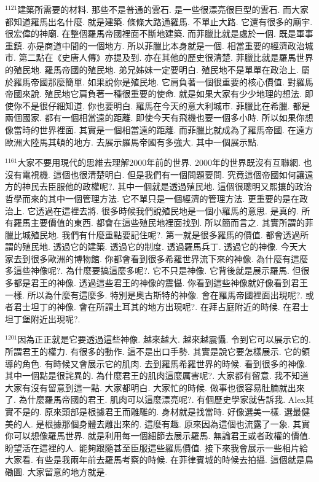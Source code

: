 \documentclass{book}
\begin{document}
$^{1121}$建築所需要的材料.
那些不是普通的雲石.
是一些很漂亮很巨型的雲石.
而大家都知道羅馬出名什麼.
就是建築.
條條大路通羅馬.
不單止大路.
它還有很多的廟宇.
很宏偉的神廟.
在整個羅馬帝國裡面不斷地建築.
而菲臘比就是處於一個.
既是軍事重鎮.
亦是商道中間的一個地方.
所以菲臘比本身就是一個.
相當重要的經濟政治城市.
第二點在《史唐人傳》亦提及到.
亦在其他的歷史很清楚.
菲臘比就是羅馬世界的殖民地.
羅馬帝國的殖民地.
弟兄姊妹一定要明白.
殖民地不是單單在政治上.
屬於羅馬帝國那麼簡單.
如果說你是殖民地.
它肩負著一個很重要的核心價值.
對羅馬帝國來說.
殖民地它肩負著一種很重要的使命.
就是如果大家有少少地理的想法.
即使你不是很仔細知道.
你也要明白.
羅馬在今天的意大利城市.
菲臘比在希臘.
都是兩個國家.
都有一個相當遠的距離.
即使今天有飛機也要一個多小時.
所以如果你想像當時的世界裡面.
其實是一個相當遠的距離.
而菲臘比就成為了羅馬帝國.
在遠方歐洲大陸馬其頓的地方.
去展示羅馬帝國有多強大.
其中一個展示點.

$^{1161}$大家不要用現代的思維去理解2000年前的世界.
2000年的世界既沒有互聯網.
也沒有電視機.
這個也很清楚明白.
但是我們有一個問題要問.
究竟這個帝國如何讓遠方的神民去臣服他的政權呢?.
其中一個就是透過殖民地.
這個很聰明又熙攘的政治哲學而來的其中一個管理方法.
它不單只是一個經濟的管理方法.
更重要的是在政治上.
它透過在這裡去將.
很多時候我們說殖民地是一個小羅馬的意思.
是真的.
所有羅馬主要價值的東西.
都會在這些殖民地裡面找到.
所以簡而言之.
其實所謂的菲臘比城殖民地.
我們有什麼重點要記住呢?.
第一就是很多羅馬的價值.
都會透過所謂的殖民地.
透過它的建築.
透過它的制度.
透過羅馬兵丁.
透過它的神像.
今天大家去到很多歐洲的博物館.
你都會看到很多希羅世界流下來的神像.
為什麼有這麼多這些神像呢?.
為什麼要搞這麼多呢?.
它不只是神像.
它背後就是展示羅馬.
但很多都是君王的神像.
透過這些君王的神像的震懾.
你看到這些神像就好像看到君王一樣.
所以為什麼有這麼多.
特別是奧古斯特的神像.
會在羅馬帝國裡面出現呢?.
或者君士坦丁的神像.
會在所謂土耳其的地方出現呢?.
在拜占庭附近的時候.
在君士坦丁堡附近出現呢?.

$^{1201}$因為正正就是它要透過這些神像.
越來越大.
越來越震懾.
令到它可以展示它的.
所謂君王的權力.
有很多的動作.
這不是出口手勢.
其實是說它要怎樣展示.
它的領導的角色.
有時候又會展示它的肌肉.
去到羅馬希羅世界的時候.
看到很多的神像.
其中一個點是很詫異的.
為什麼君王的肌肉這麼厲害呢?.
大家都有留意.
我不知道大家有沒有留意到這一點.
大家都明白.
大家忙的時候.
做事也很容易肚腩就出來了.
為什麼羅馬帝國的君王.
肌肉可以這麼漂亮呢?.
有個歷史學家就告訴我.
Alex其實不是的.
原來頭部是根據君王而雕雕的.
身材就是找當時.
好像選美一樣.
選最健美的人.
是根據那個身體去雕出來的.
這麼有趣.
原來因為這個也流露了一象.
其實你可以想像羅馬世界.
就是利用每一個細節去展示羅馬.
無論君王或者政權的價值.
盼望活在這裡的人.
能夠跟隨甚至臣服這些羅馬價值.
接下來我會展示一些相片給大家看.
有些是我兩年前去羅馬考察的時候.
在菲律賓城的時候去拍攝.
這個就是鳥磡圖.
大家留意的地方就是.
\end{document}
